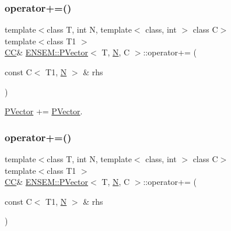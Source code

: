 \subsubsection{\texorpdfstring{operator+=()}{operator+=()}\hspace{0.1cm}{\footnotesize\ttfamily [1/3]}}
{\footnotesize\ttfamily template$<$class T, int N, template$<$ class, int $>$ class C$>$ \\
template$<$class T1 $>$ \\
\mbox{\hyperlink{classENSEM_1_1PVector_a92dc0a0a301a3dc96f7be5d337019bc7}{CC}}\& \mbox{\hyperlink{classENSEM_1_1PVector}{E\+N\+S\+E\+M\+::\+P\+Vector}}$<$ T, \mbox{\hyperlink{adat__devel_2lib_2hadron_2operator__name__util_8cc_a7722c8ecbb62d99aee7ce68b1752f337}{N}}, C $>$\+::operator+= (\begin{DoxyParamCaption}\item[{const C$<$ T1, \mbox{\hyperlink{adat__devel_2lib_2hadron_2operator__name__util_8cc_a7722c8ecbb62d99aee7ce68b1752f337}{N}} $>$ \&}]{rhs }\end{DoxyParamCaption})\hspace{0.3cm}{\ttfamily [inline]}}



\mbox{\hyperlink{classENSEM_1_1PVector}{P\+Vector}} += \mbox{\hyperlink{classENSEM_1_1PVector}{P\+Vector}}. 

\mbox{\label{classENSEM_1_1PVector_a39e015a8751290105c2960d1607c1ce8}} 
\subsubsection{\texorpdfstring{operator+=()}{operator+=()}\hspace{0.1cm}{\footnotesize\ttfamily [2/3]}}
{\footnotesize\ttfamily template$<$class T, int N, template$<$ class, int $>$ class C$>$ \\
template$<$class T1 $>$ \\
\mbox{\hyperlink{classENSEM_1_1PVector_a92dc0a0a301a3dc96f7be5d337019bc7}{CC}}\& \mbox{\hyperlink{classENSEM_1_1PVector}{E\+N\+S\+E\+M\+::\+P\+Vector}}$<$ T, \mbox{\hyperlink{adat__devel_2lib_2hadron_2operator__name__util_8cc_a7722c8ecbb62d99aee7ce68b1752f337}{N}}, C $>$\+::operator+= (\begin{DoxyParamCaption}\item[{const C$<$ T1, \mbox{\hyperlink{adat__devel_2lib_2hadron_2operator__name__util_8cc_a7722c8ecbb62d99aee7ce68b1752f337}{N}} $>$ \&}]{rhs }\end{DoxyParamCaption})\hspace{0.3cm}{\ttfamily [inline]}}



